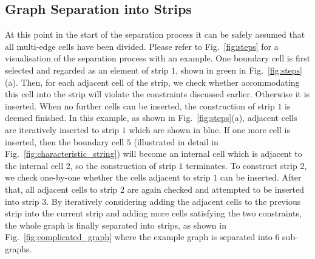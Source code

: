 \documentclass[journal]{IEEEtran}
\begin{document}
\subsection{Graph Separation into Strips}
At this point in the start of the separation process it can be safely assumed that all multi-edge cells have been divided. %
Please refer to Fig.~\ref{fig:steps} for a visualisation of the separation process with an example. One boundary cell is first selected and regarded as an element of strip $1$, shown in green in Fig.~\ref{fig:steps}(a).
Then, for each adjacent cell of the strip, we check whether accommodating this cell into the strip will violate the constraints discussed earlier. 
Otherwise it is inserted. 
When no further cells can be inserted, the construction of strip $1$ is deemed finished. 
In this example, as shown in Fig.~\ref{fig:steps}(a), adjacent cells are iteratively inserted to strip $1$ which are shown in blue. If one more cell is inserted, then the boundary cell $5$ (illustrated in detail in Fig.~\ref{fig:characteristic_string}) will become an internal cell which is adjacent to the internal cell $2$, so the construction of strip $1$ terminates.  
To construct strip $2$, we check one-by-one whether the cells adjacent to strip $1$ can be inserted. 
After that, all adjacent cells to strip $2$  are again checked and attempted to be inserted into strip $3$. 
By iteratively considering adding the adjacent cells to the previous strip into the current strip and adding more cells satisfying the two constraints, 
the whole graph is finally separated into strips, as shown in Fig.~\ref{fig:complicated_graph} where the example graph is separated into $6$ sub-graphs. 
\end{document}
